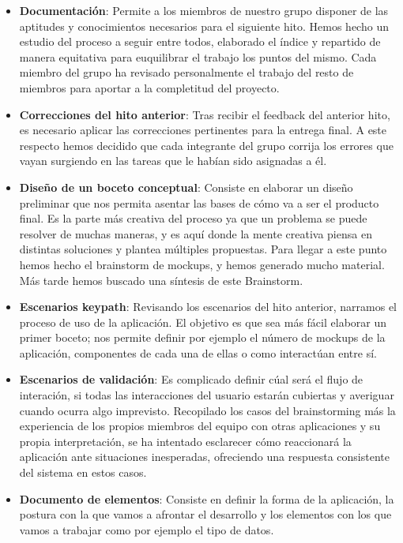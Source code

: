 \documentclass[12pt]{article}
\begin{document}
\begin{itemize}

\item \textbf{Documentación}: Permite a los miembros de nuestro grupo disponer de las aptitudes y conocimientos necesarios para el siguiente hito. Hemos hecho un estudio del proceso a seguir entre todos, elaborado el índice y repartido de manera equitativa para euquilibrar el trabajo los puntos del mismo. Cada miembro del grupo ha revisado personalmente el trabajo del resto de miembros para aportar a la completitud del proyecto.

\item \textbf{Correcciones del hito anterior}: Tras recibir el feedback del anterior hito, es necesario aplicar las correcciones pertinentes para la entrega final. A este respecto hemos decidido que cada integrante del grupo corrija los errores que vayan surgiendo en las tareas que le habían sido asignadas a él.

\item \textbf{Diseño de un boceto conceptual}: Consiste en elaborar un diseño preliminar que nos permita asentar las bases de cómo va a ser el producto final. Es la parte más creativa del proceso ya que un problema se puede resolver de muchas maneras, y  es aquí donde la mente creativa piensa en distintas soluciones y plantea múltiples propuestas. Para llegar a este punto hemos hecho el brainstorm de mockups, y hemos generado mucho material. Más tarde hemos buscado una síntesis de este Brainstorm.

\item \textbf{Escenarios keypath}: Revisando los escenarios del hito anterior, narramos el proceso de uso de la aplicación. El objetivo es que sea más fácil elaborar un primer boceto; nos permite definir por ejemplo el número de mockups de la aplicación, componentes de cada una de ellas o como interactúan entre sí.

\item \textbf{Escenarios de validación}: Es complicado definir cúal será el flujo de interación, si todas las interacciones del usuario estarán cubiertas y averiguar cuando ocurra algo imprevisto. Recopilado los casos del brainstorming más la experiencia de los propios miembros del equipo con otras aplicaciones y su propia interpretación, se ha intentado esclarecer cómo reaccionará la aplicación ante situaciones inesperadas, ofreciendo una respuesta consistente del sistema en estos casos.

\item \textbf{Documento de elementos}: Consiste en definir la forma de la aplicación, la postura con la que vamos a afrontar el desarrollo y los elementos con los que vamos a trabajar como por ejemplo el tipo de datos.


\end{itemize}
\end{document}
